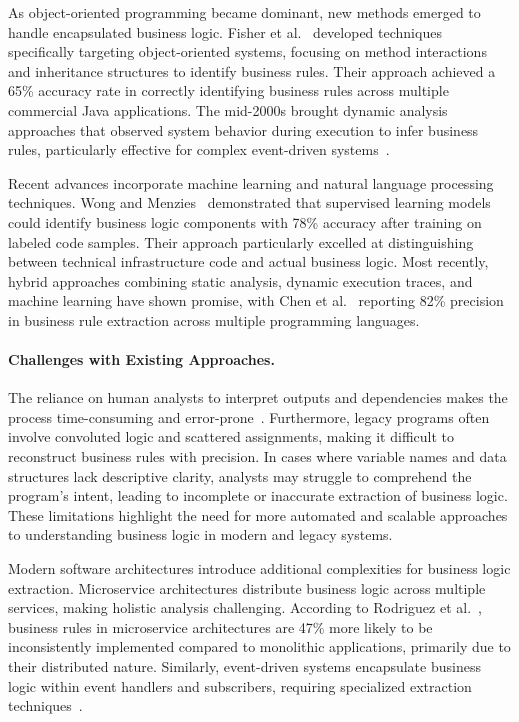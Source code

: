 \hspace{0.5cm} As object-oriented programming became dominant, new methods emerged to handle encapsulated business logic. Fisher et al.~\cite{OOPBusinessLogic} developed techniques specifically targeting object-oriented systems, focusing on method interactions and inheritance structures to identify business rules. Their approach achieved a 65\% accuracy rate in correctly identifying business rules across multiple commercial Java applications. The mid-2000s brought dynamic analysis approaches that observed system behavior during execution to infer business rules, particularly effective for complex event-driven systems~\cite{DynamicBLAnalysis}.

\hspace{0.5cm} Recent advances incorporate machine learning and natural language processing techniques. Wong and Menzies~\cite{MLBusinessLogic} demonstrated that supervised learning models could identify business logic components with 78\% accuracy after training on labeled code samples. Their approach particularly excelled at distinguishing between technical infrastructure code and actual business logic. Most recently, hybrid approaches combining static analysis, dynamic execution traces, and machine learning have shown promise, with Chen et al.~\cite{HybridBLExtraction} reporting 82\% precision in business rule extraction across multiple programming languages.

\paragraph{Challenges with Existing Approaches.} The reliance on human analysts to interpret outputs and dependencies makes the process time-consuming and error-prone~\cite{BusinessRules}. Furthermore, legacy programs often involve convoluted logic and scattered assignments, making it difficult to reconstruct business rules with precision. In cases where variable names and data structures lack descriptive clarity, analysts may struggle to comprehend the program's intent, leading to incomplete or inaccurate extraction of business logic. These limitations highlight the need for more automated and scalable approaches to understanding business logic in modern and legacy systems.

\hspace{0.5cm} Modern software architectures introduce additional complexities for business logic extraction. Microservice architectures distribute business logic across multiple services, making holistic analysis challenging. According to Rodriguez et al.~\cite{MicroservicesBL}, business rules in microservice architectures are 47\% more likely to be inconsistently implemented compared to monolithic applications, primarily due to their distributed nature. Similarly, event-driven systems encapsulate business logic within event handlers and subscribers, requiring specialized extraction techniques~\cite{EventDrivenBL}.

